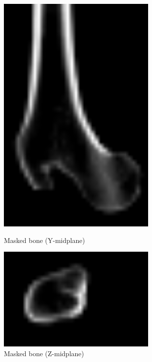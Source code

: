 \documentclass[a4paper,12pt]{article}
\begin{document}
\begin{figure}[htbp]
\begin{minipage}[b]{0.3\textwidth}
            \includegraphics[width=0.7\textwidth]{bone_masked-YM}
            \caption{Masked bone (Y-midplane)}
            \label{fig:bone_masked-YM}
        \end{minipage}
        \hfill
        \begin{minipage}[b]{0.3\textwidth}
            \includegraphics[width=0.7\textwidth]{bone_masked-ZM}
            \caption{Masked bone (Z-midplane)}
            \label{fig:bone_masked-ZM}
        \end{minipage}
    \end{figure}
\end{document}
